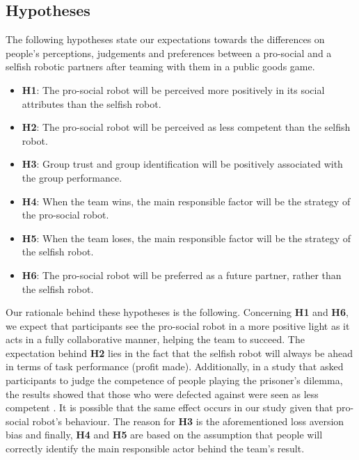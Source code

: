 \subsection{Hypotheses}
The following hypotheses state our expectations towards the differences on people's perceptions, judgements and preferences between a pro-social and a selfish robotic partners after teaming with them in a public goods game.
\begin{itemize}
    \item[] \textbf{H1}: The pro-social robot will be perceived more positively in its social attributes than the selfish robot.
    \item[] \textbf{H2}: The pro-social robot will be perceived as less competent than the selfish robot.
    \item[] \textbf{H3}: Group trust and group identification will be positively associated with the group performance.
    \item[] \textbf{H4}: When the team wins, the main responsible factor will be the strategy of the pro-social robot.
    \item[] \textbf{H5}: When the team loses, the main responsible factor will be the strategy of the selfish robot.
    \item[] \textbf{H6}: The pro-social robot will be preferred as a future partner, rather than the selfish robot.
\end{itemize}

Our rationale behind these hypotheses is the following. Concerning \textbf{H1} and \textbf{H6}, we expect that participants see the pro-social robot in a more positive light as it acts in a fully collaborative manner, helping the team to succeed.
The expectation behind \textbf{H2} lies in the fact that the selfish robot will always be ahead in terms of task performance (profit made). Additionally, in a study that asked participants to judge the competence of people playing the prisoner's dilemma, the results showed that those who were defected against were seen as less competent \cite{krueger2007perceptions}. It is possible that the same effect occurs in our study given that pro-social robot's behaviour. The reason for \textbf{H3} is the aforementioned loss aversion bias \cite{kahneman2013choices} and finally, \textbf{H4} and \textbf{H5} are based on the assumption that people will correctly identify the main responsible actor behind the team's result.

